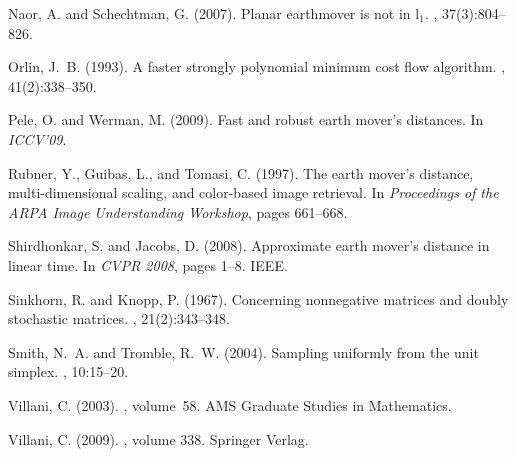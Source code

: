 \documentclass{amsart} %
\begin{document}
{{\begin{thebibliography}{}
Naor, A. and Schechtman, G. (2007).
\newblock Planar earthmover is not in l$_{\mbox{1}}$.
, 37(3):804--826.

Orlin, J.~B. (1993).
\newblock A faster strongly polynomial minimum cost flow algorithm.
, 41(2):338--350.

Pele, O. and Werman, M. (2009).
\newblock Fast and robust earth mover's distances.
\newblock In {\em ICCV'09}.

Rubner, Y., Guibas, L., and Tomasi, C. (1997).
\newblock The earth mover’s distance, multi-dimensional scaling, and
  color-based image retrieval.
\newblock In {\em Proceedings of the ARPA Image Understanding Workshop}, pages
  661--668.

Shirdhonkar, S. and Jacobs, D. (2008).
\newblock Approximate earth mover’s distance in linear time.
\newblock In {\em CVPR 2008}, pages 1--8. IEEE.

Sinkhorn, R. and Knopp, P. (1967).
\newblock Concerning nonnegative matrices and doubly stochastic matrices.
, 21(2):343--348.

Smith, N.~A. and Tromble, R.~W. (2004).
\newblock Sampling uniformly from the unit simplex.
, 10:15--20.

Villani, C. (2003).
, volume~58.
\newblock AMS Graduate Studies in Mathematics.

Villani, C. (2009).
, volume 338.
\newblock Springer Verlag.

\end{thebibliography}

}}
\end{document}
